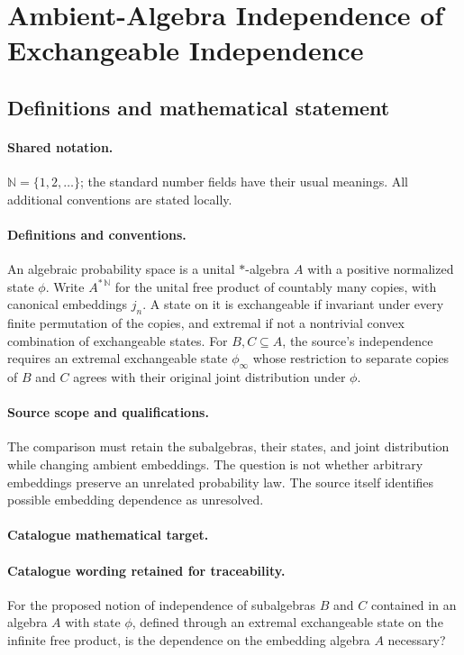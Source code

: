 \documentclass[11pt]{article}
\begin{document}
\section{Ambient-Algebra Independence of Exchangeable Independence}\label{statement}

\subsection{Definitions and mathematical statement}

\paragraph{Shared notation.}$\mathbb N=\{1,2,\ldots\}$; the standard number fields have their usual meanings. All additional conventions are stated locally.


\paragraph{Definitions and conventions.} An algebraic probability space is a unital $*$-algebra $A$ with a positive normalized state $\phi$. Write $A^{*\,\mathbb N}$ for the unital free product of countably many copies, with canonical embeddings $j_n$. A state on it is exchangeable if invariant under every finite permutation of the copies, and extremal if not a nontrivial convex combination of exchangeable states. For $B,C\subseteq A$, the source's independence requires an extremal exchangeable state $\phi_\infty$ whose restriction to separate copies of $B$ and $C$ agrees with their original joint distribution under $\phi$.

\paragraph{Source scope and qualifications.} The comparison must retain the subalgebras, their states, and joint distribution while changing ambient embeddings. The question is not whether arbitrary embeddings preserve an unrelated probability law. The source itself identifies possible embedding dependence as unresolved.

\paragraph{Catalogue mathematical target.}
\paragraph{Catalogue wording retained for traceability.}
For the proposed notion of independence of subalgebras $B$ and $C$ contained in an algebra $A$ with state $\phi$, defined through an extremal exchangeable state on the infinite free product, is the dependence on the embedding algebra $A$ necessary?
\end{document}
